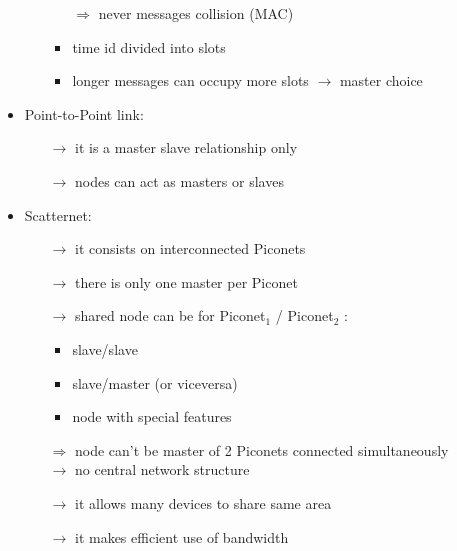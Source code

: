 \begin{itemize}
\begin{itemize}
\begin{itemize}
\begin{itemize}
            \end{itemize}
            $\Rightarrow$ never messages collision (MAC)
            \item time id divided into slots
            \item longer messages can occupy more slots $\rightarrow$ master choice
        \end{itemize}
    \end{itemize}
    \item Point-to-Point link:
    \begin{itemize}
        \item[$\rightarrow$] it is a master slave relationship only
        \item[$\rightarrow$] nodes can act as masters or slaves
    \end{itemize}
    \item Scatternet:
    \begin{itemize}
        \item[$\rightarrow$] it consists on interconnected Piconets
        \item[$\rightarrow$] there is only one master per Piconet
        \item[$\rightarrow$] shared node can be for Piconet$_1$ / Piconet$_2$ :
        \begin{itemize}
            \item slave/slave
            \item slave/master (or viceversa)
            \item node with special features
        \end{itemize}
        $\Rightarrow$ node can't be master of 2 Piconets connected simultaneously\\
        $\rightarrow$ no central network structure
        \item[$\rightarrow$] it allows many devices to share same area
        \item[$\rightarrow$] it makes efficient use of bandwidth
    \end{itemize}
\end{itemize}

